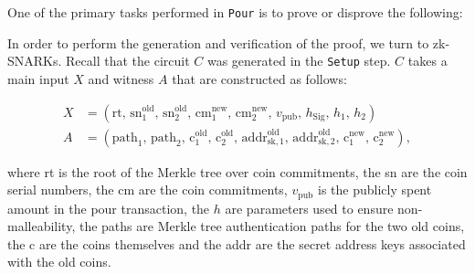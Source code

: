 \documentclass{article}
\begin{document}
One of the primary tasks performed in \texttt{Pour} is to prove or disprove the following: \newline

\medskip

In order to perform the generation and verification of the proof, we turn to zk-SNARKs. Recall that the circuit $C$ was generated in the \texttt{Setup} step. $C$ takes a main input $X$ and witness $A$ that are constructed as follows:

\begin{align}
X &= \left( \text{rt}, \, {\text{sn}}^{\text{old}}_1, \, {\text{sn}}^{\text{old}}_2, \, {\text{cm}}^{\text{new}}_1, \, {\text{cm}}^{\text{new}}_2, \, v_{\text{pub}}, \, h_{\text{Sig}}, \, h_1, \, h_2 \right) \\ 
A &= \left( \text{path}_1, \, \text{path}_2, \, {\text{c}}^{\text{old}}_1, \, {\text{c}}^{\text{old}}_2, \, {\text{addr}}^{\text{old}}_{\text{sk}, 1}, \, {\text{addr}}^{\text{old}}_{\text{sk}, 2}, \, {\text{c}}^{\text{new}}_1, \, {\text{c}}^{\text{new}}_2 \right),
\end{align}
\newline

where rt is the root of the Merkle tree over coin commitments, the sn are the coin serial numbers, the cm are the coin commitments, $v_{\text{pub}}$ is the publicly spent amount in the pour transaction, the $h$ are parameters used to ensure non-malleability, the paths are Merkle tree authentication paths for the two old coins, the c are the coins themselves and the addr are the secret address keys associated with the old coins.
\end{document}
